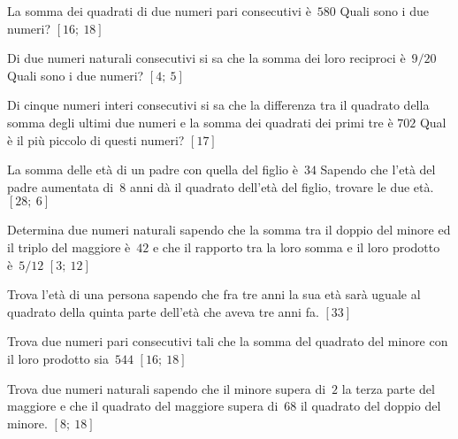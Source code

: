 \begin{htmulticols}{2}
\begin{esercizio}[*]
 \label{ese:3.118}
La somma dei quadrati di due numeri pari consecutivi è~\(580\) Quali sono i
due numeri?
\hfill\(\left[16;~18\right]\)
\end{esercizio}

\begin{esercizio}[*]
 \label{ese:3.119}
Di due numeri naturali consecutivi si sa che la somma dei loro reciproci
è~\(9/20\) Quali sono i due numeri?
\hfill\(\left[4;~5\right]\)
\end{esercizio}

\begin{esercizio}[*]
 \label{ese:3.120}
Di cinque numeri interi consecutivi si sa che la differenza tra il quadrato
della somma degli ultimi due numeri e la somma dei quadrati dei primi tre è
\( 702\) Qual è il più piccolo di questi numeri?
\hfill\(\left[17\right]\)
\end{esercizio}

 \begin{esercizio}[*]
 \label{ese:3.121}
La somma delle età di un padre con quella del figlio è~\(34\) Sapendo che
l'età del padre aumentata di~\(8\) anni dà il quadrato dell'età del figlio,
trovare le due età.
\hfill\(\left[28;~6\right]\)
\end{esercizio}

\begin{esercizio}[*]
 \label{ese:3.122}
Determina due numeri naturali sapendo che la somma tra il doppio del minore
ed il triplo del maggiore è~\(42\) e che il rapporto tra la loro somma e il 
loro
prodotto è~\(5/12\)
\hfill\(\left[3;~12\right]\)
\end{esercizio}

\begin{esercizio}[*]
 \label{ese:3.123}
Trova l'età di una persona sapendo che fra tre anni la sua età sarà
uguale al quadrato della quinta parte dell'età che aveva tre anni fa.
\hfill\(\left[33\right]\)
\end{esercizio}

\begin{esercizio}[*]
 \label{ese:3.124}
Trova due numeri pari consecutivi tali che la somma del quadrato del minore
con il loro prodotto sia~\(544\)
\hfill\(\left[16;~18\right]\)
\end{esercizio}

\begin{esercizio}[*]
 \label{ese:3.125}
Trova due numeri naturali sapendo che il minore supera di~\(2\) la terza 
parte del maggiore e che il quadrato del maggiore supera di~\(68\) il 
quadrato del doppio del minore.
\hfill\(\left[8;~18\right]\)
\end{esercizio}


\end{htmulticols}
